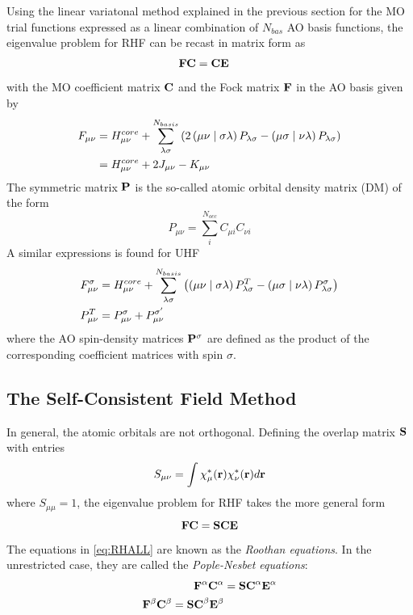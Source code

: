 \noindent Using the linear variatonal method explained in the previous section for the MO trial functions expressed as a linear combination of $N_{bas}$ AO basis functions, the eigenvalue problem for RHF can be recast in matrix form as
\begin{align}
\mathbf{F} \mathbf{C} &= \mathbf{C} \mathbf{E} 
\end{align}
\noindent with the MO coefficient matrix $\mathbf{C}$ and the Fock matrix $\mathbf{F}$ in the AO basis given by
\begin{align}
F_{\mu\nu} &= H^{core}_{\mu\nu} + \sum_{\lambda\sigma}^{N_{basis}} \left(2 \left( \mu\nu \mid \sigma\lambda \right) P_{\lambda\sigma} - \left( \mu\sigma \mid \nu\lambda \right) P_{\lambda\sigma} \right) \\
&= H^{core}_{\mu\nu} + 2 J_{\mu\nu} - K_{\mu\nu} 
\end{align}
\noindent The symmetric matrix $\mathbf{P}$ is the so-called atomic orbital density matrix (DM) of the form
\begin{equation}
P_{\mu\nu} = \sum_i^{N_{occ}} C_{\mu i} C_{\nu i} 
\end{equation}
\noindent A similar expressions is found for UHF
\begin{equation}
\begin{split}
F_{\mu\nu}^{\sigma} &= H^{core}_{\mu\nu} + \sum_{\lambda\sigma}^{N_{basis}} \left( \left( \mu\nu \mid \sigma\lambda \right) P^{T}_{\lambda\sigma} - \left( \mu\sigma \mid \nu\lambda \right) P^{\sigma}_{\lambda\sigma} \right) \\
P^T_{\mu\nu} &= P^{\sigma}_{\mu\nu} + P^{\sigma'}_{\mu\nu} 
\end{split}
\end{equation}
\noindent where the AO spin-density matrices $\mathbf{P}^{\sigma}$ are defined as the product of the corresponding coefficient matrices with spin $\sigma$.  

\subsection{The Self-Consistent Field Method}

In general, the atomic orbitals are not orthogonal. Defining the overlap matrix $\mathbf{S}$ with entries 
\begin{equation}
S_{\mu\nu} = \int \chi_{\mu}^*(\mathbf{r}) \chi_{\nu}^*(\mathbf{r}) d\mathbf{r}
\end{equation}
\noindent where $S_{\mu\mu} = 1$, the eigenvalue problem for RHF takes the more general form
\begin{equation}
\mathbf{F} \mathbf{C} = \mathbf{SC} \mathbf{E}
\label{eq:RHALL}
\end{equation}
\noindent The equations in \ref{eq:RHALL} are known as the \emph{Roothan equations}. In the unrestricted case, they are called the \emph{Pople-Nesbet equations}:
\begin{align}
\mathbf{F}^{\alpha} \mathbf{C}^{\alpha} &= \mathbf{SC}^{\alpha} \mathbf{E}^{\alpha} \\
\mathbf{F}^{\beta} \mathbf{C}^{\beta} = \mathbf{SC}^{\beta} \mathbf{E}^{\beta}
\end{align}  

